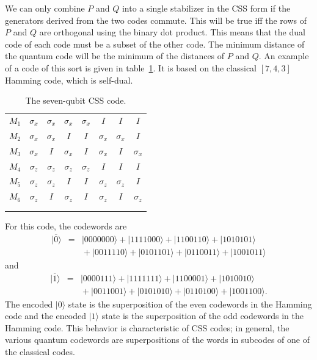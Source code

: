 \documentclass{report}
\newcommand{\ket}[1]{|{#1}\rangle}
\newcommand{\X}{\sigma_x}
\newcommand{\Z}{\sigma_z}
\newcommand{\Xbar}{\overline{X}}
\newcommand{\Zbar}{\overline{Z}}
\newcommand{\low}[1]{\raisebox{-0.3ex}{{#1}}}
\begin{document}
We can only combine $P$ and $Q$ into a single stabilizer in the CSS form if 
the generators derived from the two codes commute.  This will be true iff the 
rows of $P$ and $Q$ are orthogonal using the binary dot product.  This 
means that the dual code of each code must be a subset of the other code.  
The minimum distance of the quantum code will be the minimum of the 
distances of $P$ and $Q$.  An example of a code of this sort is given in 
table~\ref{table-7qubit}.  It is based on the classical $[7,4,3]$ Hamming 
code, which is self-dual.
\begin{table}
\centering
\begin{tabular}{c|ccccccc}
$M_1$ & $\X$ & $\X$ & $\X$ & $\X$ & $I$ & $I$ & $I$ \\
$M_2$ & $\X$ & $\X$ & $I$ & $I$ & $\X$ & $\X$ & $I$ \\
$M_3$ & $\X$ & $I$ & $\X$ & $I$ & $\X$ & $I$ & $\X$ \\
$M_4$ & $\Z$ & $\Z$ & $\Z$ & $\Z$ & $I$ & $I$ & $I$ \\
$M_5$ & $\Z$ & $\Z$ & $I$ & $I$ & $\Z$ & $\Z$ & $I$ \\
$M_6$ & $\Z$ & $I$ & $\Z$ & $I$ & $\Z$ & $I$ & $\Z$ \\
\hline
\low{$\Xbar$} & \low{$I$} & \low{$I$} & \low{$I$} & \low{$I$} & \low{$\X$} & 
\low{$\X$} & \low{$\X$} \\
\low{$\Zbar$} & \low{$I$} & \low{$I$} & \low{$I$} & \low{$I$} & \low{$\Z$} & 
\low{$\Z$} & \low{$\Z$}
\end{tabular}
\caption{The seven-qubit CSS code.}
\label{table-7qubit}
\end{table}
For this code, the codewords are
\begin{eqnarray}
\ket{\overline{0}} & = & \ket{0000000} + \ket{1111000} + \ket{1100110} +
\ket{1010101} \nonumber \\
& & \mbox{} + \ket{0011110} + \ket{0101101} + \ket{0110011} + \ket{1001011}
\end{eqnarray}
and
\begin{eqnarray}
\ket{\overline{1}} & = & \ket{0000111} + \ket{1111111} + \ket{1100001} +
\ket{1010010} \nonumber \\
& & \mbox{} + \ket{0011001} + \ket{0101010} + \ket{0110100} + \ket{1001100}.
\end{eqnarray}
The encoded $\ket{0}$ state is the superposition of the even codewords in
the Hamming code and the encoded $\ket{1}$ state is the superposition of
the odd codewords in the Hamming code.  This behavior is characteristic
of CSS codes; in general, the various quantum codewords are superpositions
of the words in subcodes of one of the classical codes.
\end{document}
